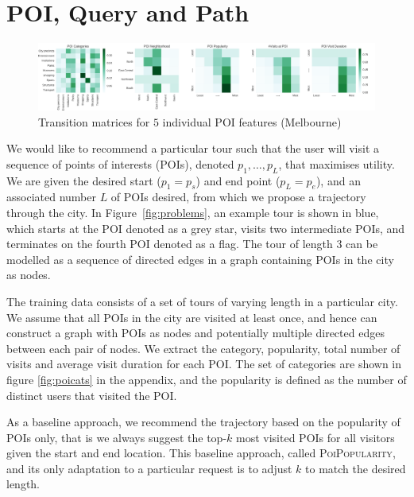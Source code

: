 \section{POI, Query and Path}
\label{sec:method}

\begin{figure}
\includegraphics[width=\textwidth]{fig/poi_transmat.png}
\caption{Transition matrices for $5$ individual POI features (Melbourne)}
\label{fig:transmat}
\end{figure}


We would like to recommend a particular tour such that the user will visit a sequence of points of interests (POIs), denoted $p_1, \ldots, p_L$, that maximises utility. We are given the desired start ($p_1=p_s$) and end point ($p_L=p_e$), and an associated number $L$ of POIs desired, from which we propose a trajectory through the city. In Figure~\ref{fig:problems}, an example tour is shown in blue, which starts at the POI denoted as a grey star, visits two intermediate POIs, and terminates on the fourth POI denoted as a flag. The tour of length 3 can be modelled as a sequence of directed edges in a graph containing POIs in the city as nodes.

The training data consists of a set of tours of varying length in a particular city. We assume that all POIs in the city are visited at least once, and hence can construct a graph with POIs as nodes and potentially multiple directed edges between each pair of nodes. We extract the category, popularity, total number of visits and average visit duration for each POI. The set of categories are shown in figure \ref{fig:poicats} in the appendix, and the popularity is defined as the number of distinct users that visited the POI\cite{ht10}.

As a baseline approach, we recommend the trajectory based on the popularity of POIs only, that is we always suggest the top-$k$ most visited POIs for all visitors given the start and end location. This baseline approach, called \textsc{PoiPopularity}, and its only adaptation to a particular request is to adjust $k$ to match the desired length.



